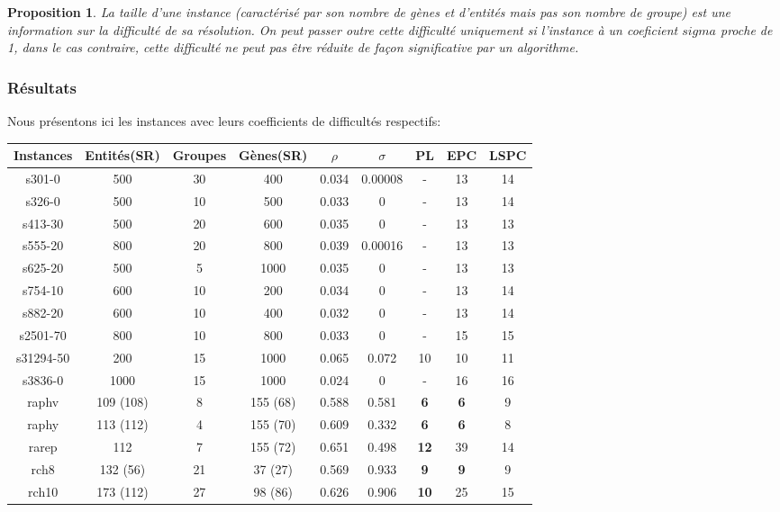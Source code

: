 \documentclass[a4paper,10pt]{article}
\newtheorem{proposition}{Proposition}
\begin{document}
\begin{proposition}
La taille d'une instance (caractérisé par son nombre de gènes et d'entités mais pas son nombre de groupe) est une information sur la difficulté de sa résolution. On peut passer outre cette difficulté uniquement si l'instance à un coeficient $sigma$ proche de 1, dans le cas contraire, cette difficulté ne peut pas être réduite de façon significative par un algorithme.
\end{proposition}


\subsubsection{Résultats}

Nous présentons ici les instances avec leurs coefficients de difficultés respectifs:
\begin{center}
\begin{tabular}{|c|c|c|c|c|c|c|c|c|}
\hline 
Instances & Entités(SR) & Groupes & Gènes(SR)& $\rho$ & $\sigma$ & PL & EPC & LSPC \\ 
\hline 
s301-0 & 500 & 30 & 400 & 0.034 & 0.00008 & - & 13 & 14 \\ 
\hline 
s326-0 & 500 & 10 & 500 & 0.033 & 0 & - & 13 & 14 \\ 
\hline 
s413-30 & 500 & 20 & 600 & 0.035 & 0 & - & 13 & 13 \\ 
\hline 
s555-20 & 800 & 20 & 800 & 0.039 & 0.00016 & - & 13 & 13 \\ 
\hline 
s625-20 & 500 & 5 & 1000 & 0.035 & 0 & - & 13 & 13 \\ 
\hline 
s754-10 & 600 & 10 & 200 & 0.034 & 0 & - & 13 & 14 \\ 
\hline 
s882-20 & 600 & 10 & 400 & 0.032 & 0 & - & 13 & 14 \\ 
\hline 
s2501-70 & 800 & 10 & 800 & 0.033 & 0 & - & 15 & 15 \\ 
\hline 
s31294-50 & 200 & 15 & 1000 & 0.065 & 0.072 & 10 & 10 & 11 \\ 
\hline 
s3836-0 & 1000 & 15 & 1000 & 0.024 & 0 & - & 16 & 16 \\ 
\hline 
raphv & 109 (108) & 8 & 155 (68) & 0.588 & 0.581 & \textbf{6} & \textbf{6} & 9 \\ 
\hline 
raphy & 113 (112) & 4 & 155 (70) & 0.609 & 0.332 & \textbf{6} & \textbf{6} & 8 \\ 
\hline 
rarep & 112 & 7 & 155 (72) & 0.651 & 0.498 & \textbf{12} & 39 & 14 \\ 
\hline 
rch8 & 132 (56) & 21 & 37 (27) & 0.569 & 0.933 & \textbf{9} & \textbf{9} & 9 \\ 
\hline 
rch10 & 173 (112) & 27 & 98 (86) & 0.626 & 0.906 & \textbf{10} & 25 & 15 \\ 
\hline 
\end{tabular} 
\end{center}
\end{document}
